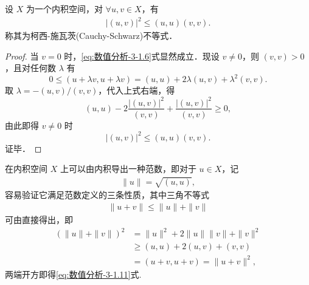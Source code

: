 \documentclass[../../main.tex]{subfiles}
\begin{document}
\begin{theorem}\label{theorem:数值分析-3-定理-2}
设 \( X \) 为一个内积空间，对 \( \forall u, v \in X \)，有
\begin{align}
|(u, v)|^2 \leqslant (u, u)(v, v).\label{eq:数值分析-3-1.6}
\end{align}
称其为柯西-施瓦茨(Cauchy-Schwarz)不等式．
\end{theorem}
\begin{proof}
当 \( v = 0 \) 时，\eqref{eq:数值分析-3-1.6}式显然成立．现设 \( v \neq 0 \)，则 \( (v, v) > 0 \)，且对任何数 \( \lambda \) 有
\[
0 \leqslant (u + \lambda v, u + \lambda v) = (u, u) + 2\lambda (u, v) + \lambda^2 (v, v).
\]
取 \( \lambda = -(u, v)/(v, v) \)，代入上式右端，得
\[
(u, u) - 2\frac{|(u, v)|^2}{(v, v)} + \frac{|(u, v)|^2}{(v, v)} \geqslant 0,
\]
由此即得 \( v \neq 0 \) 时
\[
|(u, v)|^2 \leqslant (u, u)(v, v).
\]
证毕．

\end{proof}
\begin{remark}
在内积空间 \( X \) 上可以由内积导出一种范数，即对于 \( u \in X \)，记
\begin{align}
\| u \| = \sqrt{(u, u)}, \label{eq:数值分析-3-1.10}
\end{align}
容易验证它满足范数定义的三条性质，其中三角不等式
\begin{align}
\| u + v \| \leqslant \| u \| + \| v \| \label{eq:数值分析-3-1.11}
\end{align}
可由直接得出，即
\begin{align*}
(\parallel u\parallel +\parallel v\parallel )^2&=\parallel u\parallel ^2+2\parallel u\parallel \parallel v\parallel +\parallel v\parallel ^2
\\
&\geqslant (u,u)+2(u,v)+(v,v)
\\
&=(u+v,u+v)=\parallel u+v\parallel ^2,
\end{align*}
两端开方即得\eqref{eq:数值分析-3-1.11}式.
\end{remark}
\end{document}

